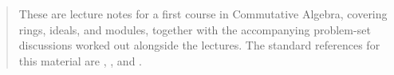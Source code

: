 \documentclass[11pt]{book}
\begin{document}



\begin{abstract}
These are lecture notes for a first course in Commutative Algebra, covering rings, ideals, and modules, together with the accompanying problem-set discussions worked out alongside the lectures. The standard references for this material are \cite{AtiyahMacdonald}, \cite{Blyth1990}, and \cite{DummitFoote2004}.
\end{abstract}

\tableofcontents



% 



\end{document}
